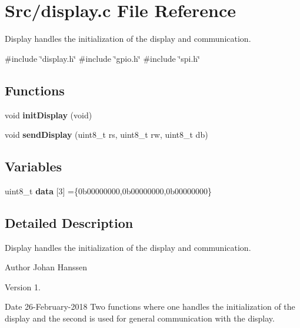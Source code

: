 \section{Src/display.c File Reference}
\label{display_8c}


Display handles the initialization of the display and communication.  


{\ttfamily \#include \char`\"{}display.\+h\char`\"{}}\newline
{\ttfamily \#include \char`\"{}gpio.\+h\char`\"{}}\newline
{\ttfamily \#include \char`\"{}spi.\+h\char`\"{}}\newline
\subsection*{Functions}
\begin{DoxyCompactItemize}
\item 
void \textbf{ init\+Display} (void)
\item 
void \textbf{ send\+Display} (uint8\+\_\+t rs, uint8\+\_\+t rw, uint8\+\_\+t db)
\end{DoxyCompactItemize}
\subsection*{Variables}
\begin{DoxyCompactItemize}
\item 
uint8\+\_\+t \textbf{ data} [3] =\{0b00000000,0b00000000,0b00000000\}
\end{DoxyCompactItemize}


\subsection{Detailed Description}
Display handles the initialization of the display and communication. 

\begin{DoxyAuthor}{Author}
Johan Hanssen 
\end{DoxyAuthor}
\begin{DoxyVersion}{Version}
1. 
\end{DoxyVersion}
\begin{DoxyDate}{Date}
26-\/\+February-\/2018 Two functions where one handles the initialization of the display and the second is used for general communication with the display. 
\end{DoxyDate}


